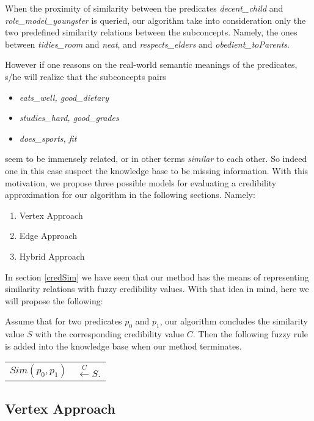 \documentclass[egilmezThesis.tex]{subfiles}
\begin{document}
When the proximity of similarity between the predicates \textit{decent\_child} and \linebreak[4] \textit{role\_model\_youngster} is queried, our algorithm take into consideration only the two predefined similarity relations between the subconcepts. Namely, the ones between \textit{tidies\_room} and \textit{neat}, and \textit{respects\_elders} and \textit{obedient\_toParents}.

However if one reasons on the real-world semantic meanings of the predicates, s/he will realize that the subconcepts pairs
\begin{itemize}
\item \textit{eats\_well, good\_dietary}
\item \textit{studies\_hard, good\_grades}
\item \textit{does\_sports, fit}
\end{itemize}

seem to be immensely related, or in other terms \textit{similar} to each other. So indeed one in this case suspect the knowledge base to be missing information. With this motivation, we propose three possible models for evaluating a credibility approximation for our algorithm in the following sections. Namely:
\begin{enumerate}
\item Vertex Approach
\item Edge Approach
\item Hybrid Approach
\end{enumerate}

In section \ref{credSim} we have seen that our method has the means of representing similarity relations with fuzzy credibility values. With that idea in mind, here we will propose the following:

Assume that for two predicates $p_0$ and $p_1$, our algorithm concludes the similarity value $S$ with the corresponding credibility value $C$. Then the following fuzzy rule is added into the knowledge base when our method terminates.

\begin{tabular}{l l}
$Sim(p_0, p_1)$ & $\stackrel{C}{\longleftarrow} S.$\\
\end{tabular}

\subsection{Vertex Approach}
\label{va}
\end{document}

